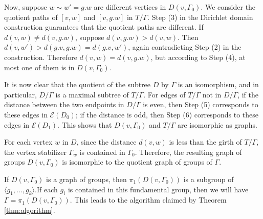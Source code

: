 \documentclass[12pt,leqno]{amsart}
\makeatletter
\renewenvironment{proof}[1][\proofname]{%
	\par
	\pushQED{\qed}%
	\normalfont
	\topsep6\p@\@plus6\p@\relax
	\trivlist
	\item[\hskip\labelsep\itshape #1\@addpunct{.}]%
	\ignorespaces
}{%
	\par\nobreak\vspace{2pt}%
	\popQED%
	\medskip%
	\endtrivlist
	\@endpefalse
}
\newcommand{\2}{L^2_{\rm per}(0, T)}
\numberwithin{equation}{section}
\numberwithin{figure}{section}
\makeatother
\begin{document}
\begin{proof}
\begin{proof}
        Now, suppose $w\sim w' = g.w$ are different vertices in $D(v,\Gamma_0)$. We consider the quotient paths of $[v,w]$ and $[v,g.w]$ in $T/\Gamma$. Step (3) in the Dirichlet domain construction guarantees that the quotient paths are different. If $d(v,w)\neq d(v,g.w)$, suppose $d(v,g.w)>d(v,w)$. Then $d(v,w')>d(g.v,g.w) = d(g.v,w')$, again contradicting Step (2) in the construction. Therefore $d(v,w) = d(v,g.w)$, but according to Step (4), at most one of them is in $D(v,\Gamma_0)$.
    \end{proof}
    It is now clear that the quotient of the subtree $D$ by $\Gamma$ is an isomorphism, and in particular, $D/\Gamma$ is a maximal subtree of $T/\Gamma$. For edges of $T/\Gamma$ not in $D/\Gamma$, if the distance between the two endpoints in $D/\Gamma$ is even, then Step (5) corresponds to these edges in $\mathcal{E}(D_0)$; if the distance is odd, then Step (6) corresponds to these edges in $\mathcal{E}(D_1)$. This shows that $D(v,\Gamma_0)$ and $T/\Gamma$ are isomorphic as graphs.

    For each vertex $w$ in $D$, since the distance $d(v,w)$ is less than the girth of $T/\Gamma$, the vertex stabilizer $\Gamma_w$ is contained in $\Gamma_0$. Therefore, the resulting graph of groups $D(v,\Gamma_0)$ is isomorphic to the quotient graph of groups of $\Gamma$.
\end{proof}
If $D(v,\Gamma_0)$ is a graph of groups, then $\pi_1(D(v,\Gamma_0))$ is a subgroup of $\langle g_1,\dots,g_k\rangle$.If each $g_i$ is contained in this fundamental group, then we will have $\Gamma = \pi_1(D(v,\Gamma_0))$. This leads to the algorithm claimed by Theorem \ref{thm:algorithm}.
\end{document}
